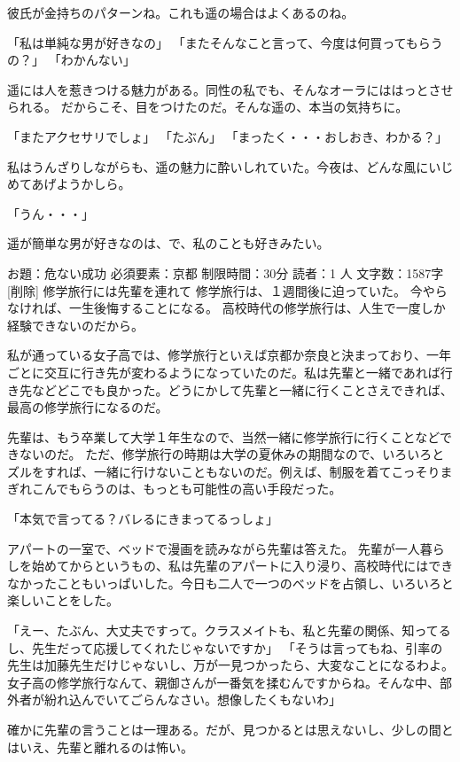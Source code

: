 彼氏が金持ちのパターンね。これも遥の場合はよくあるのね。

「私は単純な男が好きなの」
「またそんなこと言って、今度は何買ってもらうの？」
「わかんない」

遥には人を惹きつける魅力がある。同性の私でも、そんなオーラにははっとさせられる。
だからこそ、目をつけたのだ。そんな遥の、本当の気持ちに。

「またアクセサリでしょ」
「たぶん」
「まったく・・・おしおき、わかる？」

私はうんざりしながらも、遥の魅力に酔いしれていた。今夜は、どんな風にいじめてあげようかしら。

「うん・・・」

遥が簡単な男が好きなのは、で、私のことも好きみたい。




 お題：危ない成功 必須要素：京都 制限時間：30分 読者：1 人 文字数：1587字
[削除]
修学旅行には先輩を連れて
修学旅行は、１週間後に迫っていた。
今やらなければ、一生後悔することになる。
高校時代の修学旅行は、人生で一度しか経験できないのだから。

私が通っている女子高では、修学旅行といえば京都か奈良と決まっており、一年ごとに交互に行き先が変わるようになっていたのだ。私は先輩と一緒であれば行き先などどこでも良かった。どうにかして先輩と一緒に行くことさえできれば、最高の修学旅行になるのだ。

先輩は、もう卒業して大学１年生なので、当然一緒に修学旅行に行くことなどできないのだ。
ただ、修学旅行の時期は大学の夏休みの期間なので、いろいろとズルをすれば、一緒に行けないこともないのだ。例えば、制服を着てこっそりまぎれこんでもらうのは、もっとも可能性の高い手段だった。

「本気で言ってる？バレるにきまってるっしょ」

アパートの一室で、ベッドで漫画を読みながら先輩は答えた。
先輩が一人暮らしを始めてからというもの、私は先輩のアパートに入り浸り、高校時代にはできなかったこともいっぱいした。今日も二人で一つのベッドを占領し、いろいろと楽しいことをした。

「えー、たぶん、大丈夫ですって。クラスメイトも、私と先輩の関係、知ってるし、先生だって応援してくれたじゃないですか」
「そうは言ってもね、引率の先生は加藤先生だけじゃないし、万が一見つかったら、大変なことになるわよ。女子高の修学旅行なんて、親御さんが一番気を揉むんですからね。そんな中、部外者が紛れ込んでいてごらんなさい。想像したくもないわ」

確かに先輩の言うことは一理ある。だが、見つかるとは思えないし、少しの間とはいえ、先輩と離れるのは怖い。

